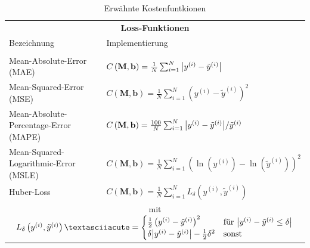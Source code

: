 \begin{table}
	\centering
	\begin{tabular}{ll}
		\multicolumn{2}{c}{\textbf{Loss-Funktionen}}\\[10pt]
		Bezeichnung & Implementierung \\
		\hline\\[-5pt]
		Mean-Absolute-Error (MAE) &$C\left(\mathbf{M}, \mathbf{b}\right) = \frac{1}{N} \sum_{i=1}^{N} \abs{y^{(i)} - \tilde{y}^{(i)}}$\\[10pt]
		Mean-Squared-Error (MSE) & $C\left(\mathbf{M}, \mathbf{b}\right) = \frac{1}{N} \sum_{i=1}^{N} \left(y^{(i)} - \tilde{y}^{(i)}\right)^2$\\[10pt]
		Mean-Absolute-Percentage-Error (MAPE) & $C\left(\mathbf{M}, \mathbf{b}\right) = \frac{100}{N} \sum_{i=1}^{N} {\abs{y^{(i)} - \tilde{y}^{(i)}}  }/{\tilde{y}^{(i)}}$\\[10pt]
		Mean-Squared-Logarithmic-Error (MSLE) &$C\left(\mathbf{M}, \mathbf{b}\right) = \frac{1}{N} \sum_{i=1}^{N} \left(\ln(y^{(i)}) - \ln(\tilde{y}^{(i)})\right)^2$ \\[10pt]
		Huber-Loss & $C\left(\mathbf{M}, \mathbf{b}\right) = \frac{1}{N} \sum_{i=1}^{N} L_{\delta}\left(y^{(i)}, \tilde{y}^{(i)}\right)$\\[10pt]
		\multicolumn{2}{c}{\hspace{1cm} mit \hspace{1cm} $L_{\delta}\left(y^{(i)}, \tilde{y}^{(i)}\right)´=\begin{cases}
			\frac{1}{2}\left(y^{(i)} -  \tilde{y}^{(i)}\right)^2 \quad &\text{für}~\abs{y^{(i)} -  \tilde{y}^{(i)} \leq \delta} \\
			\delta \abs{y^{(i)} -  \tilde{y}^{(i)}} - \frac{1}{2}\delta^2 &\text{sonst}
			\end{cases}$} \\
	\end{tabular}
	\caption{Erwähnte Kostenfuntkionen}
	\label{Loss-Funktionen-Tabelle}
\end{table}

